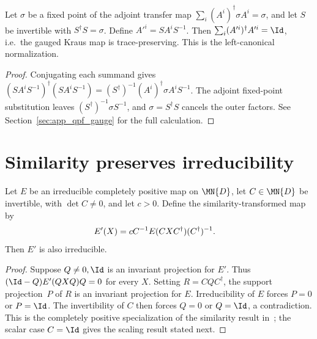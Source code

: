 \begin{theorem}\label{thm:left_canonical_gauge}
    \leanok
    Let $\sigma$ be a fixed point of the adjoint transfer map
    $\sum_i (A^i)^\dagger \sigma A^i = \sigma$,
    and let $S$ be invertible with $S^\dagger S = \sigma$.
    Define $A'^i = SA^iS^{-1}$.
    Then $\sum_i (A'^i)^\dagger A'^i = \Id$, i.e.\ the gauged
    Kraus map is trace-preserving. This is the left-canonical
    normalization.
\end{theorem}

\begin{proof}\leanok
    Conjugating each summand gives
    $(SA^iS^{-1})^\dagger(SA^iS^{-1})
        =(S^\dagger)^{-1}(A^i)^\dagger\sigma A^iS^{-1}$.
    The adjoint fixed-point substitution leaves
    $(S^\dagger)^{-1}\sigma S^{-1}$, and $\sigma=S^\dagger S$ cancels
    the outer factors. See Section~\ref{sec:app_qpf_gauge} for the full
    calculation.
\end{proof}

\section{Similarity preserves irreducibility}

\begin{lemma}%
    \label{lem:similarity_irred}
    \leanok
    Let $E$ be an irreducible completely positive map on $\MN{D}$,
    let $C \in \MN{D}$ be invertible, with $\det C \neq 0$, and let
    $c > 0$.
    Define the similarity-transformed map by
    \begin{align}
        E'(X)
         & = cC^{-1}E(CXC^\dagger)(C^\dagger)^{-1}.
        \notag
    \end{align}
    Then $E'$ is also irreducible.
\end{lemma}

\begin{proof}
    \leanok
    Suppose $Q\neq0,\Id$ is an invariant projection for $E'$.
    Thus $(\Id-Q)E'(QXQ)Q=0$ for every $X$.
    Setting $R = CQC^\dagger$, the support projection~$P$ of $R$
    is an invariant projection for $E$.
    Irreducibility of $E$ forces $P = 0$ or $P = \Id$.
    The invertibility of $C$ then forces $Q = 0$ or $Q = \Id$,
    a contradiction.
    This is the completely positive specialization of the similarity result
    in~\cite[Proposition~6.6]{Wolf2012Quantum}; the scalar case $C=\Id$
    gives the scaling result stated next.
\end{proof}



